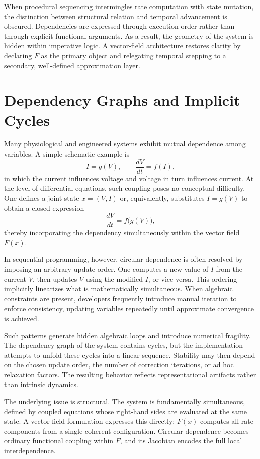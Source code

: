 \documentclass[12pt]{book}
\begin{document}
When procedural sequencing intermingles rate computation with state
mutation, the distinction between structural relation and temporal
advancement is obscured. Dependencies are expressed through execution
order rather than through explicit functional arguments. As a result,
the geometry of the system is hidden within imperative logic. A
vector-field architecture restores clarity by declaring $F$ as the
primary object and relegating temporal stepping to a secondary,
well-defined approximation layer.

\section{Dependency Graphs and Implicit Cycles}

Many physiological and engineered systems exhibit mutual dependence
among variables. A simple schematic example is
\[
I = g(V),
\qquad
\frac{dV}{dt} = f(I),
\]
in which the current influences voltage and voltage in turn influences
current. At the level of differential equations, such coupling poses no
conceptual difficulty. One defines a joint state $x = (V,I)$ or,
equivalently, substitutes $I = g(V)$ to obtain a closed expression
\[
\frac{dV}{dt} = f\big(g(V)\big),
\]
thereby incorporating the dependency simultaneously within the vector
field $F(x)$.

In sequential programming, however, circular dependence is often
resolved by imposing an arbitrary update order. One computes a new
value of $I$ from the current $V$, then updates $V$ using the modified
$I$, or vice versa. This ordering implicitly linearizes what is
mathematically simultaneous. When algebraic constraints are present,
developers frequently introduce manual iteration to enforce
consistency, updating variables repeatedly until approximate
convergence is achieved.

Such patterns generate hidden algebraic loops and introduce numerical
fragility. The dependency graph of the system contains cycles, but the
implementation attempts to unfold these cycles into a linear sequence.
Stability may then depend on the chosen update order, the number of
correction iterations, or ad hoc relaxation factors. The resulting
behavior reflects representational artifacts rather than intrinsic
dynamics.

The underlying issue is structural. The system is fundamentally
simultaneous, defined by coupled equations whose right-hand sides are
evaluated at the same state. A vector-field formulation expresses this
directly: $F(x)$ computes all rate components from a single coherent
configuration. Circular dependence becomes ordinary functional
coupling within $F$, and its Jacobian encodes the full local
interdependence.
\end{document}
